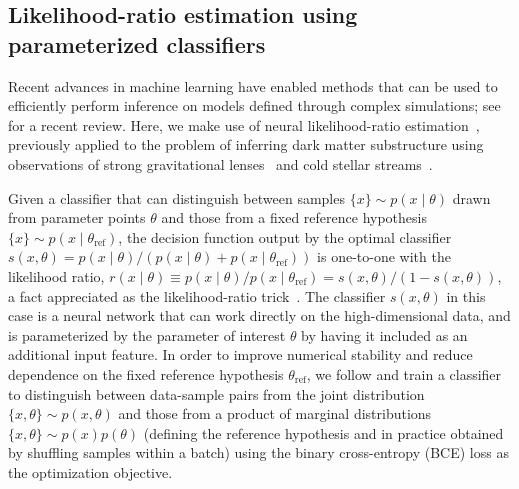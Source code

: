 \documentclass[twocolumn]{aastex631}
\begin{document}
\subsection{Likelihood-ratio estimation using parameterized classifiers} 

Recent advances in machine learning have enabled methods that can be used to efficiently perform inference on models defined through complex simulations; see \citet{Cranmer:2019eaq} for a recent review. Here, we make use of neural likelihood-ratio estimation~\citep{Cranmer:2015bka,Baldi:2016fzo,Brehmer:2018eca,Brehmer:2018hga,Brehmer:2018kdj,Hermans:2019ioj}, previously applied to the problem of inferring dark matter substructure using observations of strong gravitational lenses~\citep{Brehmer:2019jyt} and cold stellar streams~\citep{Hermans:2020skz}. 

Given a classifier that can distinguish between samples $\{x\} \sim p(x\mid\theta)$ drawn from parameter points $\theta$ and those from a fixed reference hypothesis $\{x\} \sim p(x\mid\theta_\mathrm{ref})$, the decision function output by the optimal classifier $s(x, \theta) = {p(x\mid\theta)}/{\left(p(x\mid\theta) + p(x\mid\theta_\mathrm{ref})\right)}$ is one-to-one with the likelihood ratio, $r(x\mid \theta) \equiv {p(x\mid\theta)}/{p(x\mid\theta_\mathrm{ref})}  = {s(x, \theta)}/{\left(1 - s(x, \theta)\right)}$, a fact appreciated as the likelihood-ratio trick~\citep{Cranmer:2015bka,mohamed2017learning}. 
The classifier $s(x, \theta)$ in this case is a neural network that can work directly on the high-dimensional data, and is parameterized by the parameter of interest $\theta$ by having it included as an additional input feature. In order to improve numerical stability and reduce dependence on the fixed reference hypothesis $\theta_\mathrm{ref}$, we follow \citet{Hermans:2019ioj} and train a classifier to distinguish between data-sample pairs from the joint distribution $\{x, \theta\} \sim p(x,\theta)$ and those from a product of marginal distributions $\{x, \theta\} \sim p(x)p(\theta)$ (defining the reference hypothesis and in practice obtained by shuffling samples within a batch) using the binary cross-entropy (BCE) loss as the optimization objective. 
\end{document}

